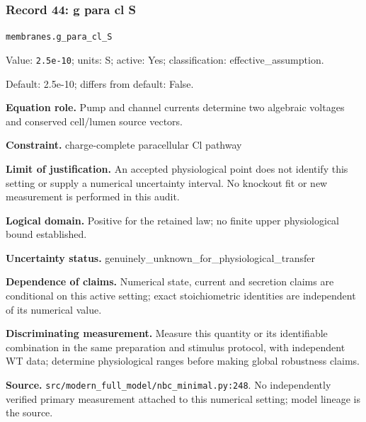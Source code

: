 \subsubsection*{Record 44: g para cl S}
{\small \nolinkurl{membranes.g_para_cl_S}\par

Value: \texttt{2.5e-10}; units: S; active: Yes; classification: effective\_assumption.\par

Default: 2.5e-10; differs from default: False.\par

\textbf{Equation role.} Pump and channel currents determine two algebraic voltages and conserved cell/lumen source vectors.\par

\textbf{Constraint.} charge-complete paracellular Cl pathway\par

\textbf{Limit of justification.} An accepted physiological point does not identify this setting or supply a numerical uncertainty interval. No knockout fit or new measurement is performed in this audit.\par

\textbf{Logical domain.} Positive for the retained law; no finite upper physiological bound established.\par

\textbf{Uncertainty status.} genuinely\_unknown\_for\_physiological\_transfer\par

\textbf{Dependence of claims.} Numerical state, current and secretion claims are conditional on this active setting; exact stoichiometric identities are independent of its numerical value.\par

\textbf{Discriminating measurement.} Measure this quantity or its identifiable combination in the same preparation and stimulus protocol, with independent WT data; determine physiological ranges before making global robustness claims.\par

\textbf{Source.} \nolinkurl{src/modern_full_model/nbc_minimal.py:248}. No independently verified primary measurement attached to this numerical setting; model lineage is the source.\par}

